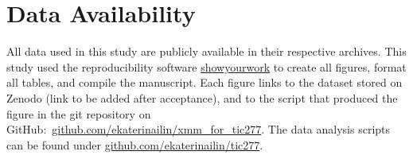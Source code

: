 \documentclass[twocolumn]{aastex631}
\begin{document}
\section*{Data Availability}
All data used in this study are publicly available in their respective archives.
This study used the reproducibility software \href{https://github.com/showyourwork/showyourwork}{showyourwork}
\citep{luger2021mappinga} to create all figures, format all tables, and compile the manuscript. Each figure links to the dataset stored on Zenodo (link to be added after acceptance), and to the script that produced the figure in the git repository on GitHub:~\href{https://github.com/ekaterinailin/xmm_for_tic277}{github.com/ekaterinailin/xmm\_for\_tic277}. The data analysis scripts can be found under \href{https://github.com/ekaterinailin/tic277}{github.com/ekaterinailin/tic277}. 


\end{document}
